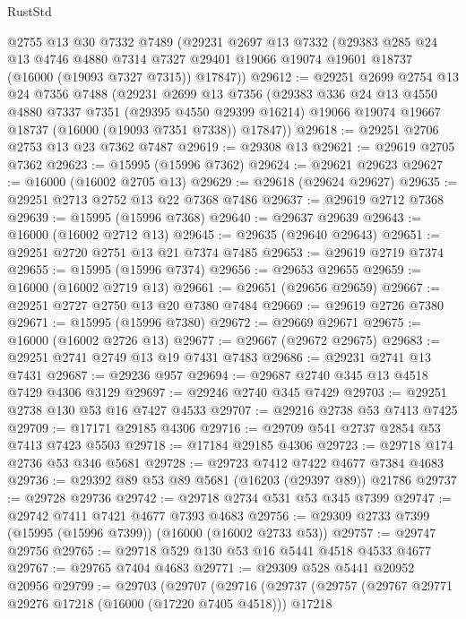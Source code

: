 \begin{lexlean}{RustStd}
\begin{coremodule}
    @2755
    @13
    @30
    @7332
    @7489
    (@29231
      @2697
      @13
      @7332
      (@29383
        @285
        @24
        @13
        @4746
        @4880
        @7314
        @7327
        @29401
        @19066
        @19074
        @19601
        @18737
        (@16000 (@19093 @7327 @7315))
        @17847))
@29612 := @29251
    @2699
    @2754
    @13
    @24
    @7356
    @7488
    (@29231
      @2699
      @13
      @7356
      (@29383
        @336
        @24
        @13
        @4550
        @4880
        @7337
        @7351
        (@29395 @4550 @29399 @16214)
        @19066
        @19074
        @19667
        @18737
        (@16000 (@19093 @7351 @7338))
        @17847))
@29618 := @29251 @2706 @2753 @13 @23 @7362 @7487
@29619 := @29308 @13
@29621 := @29619 @2705 @7362
@29623 := @15995 (@15996 @7362)
@29624 := @29621 @29623
@29627 := @16000 (@16002 @2705 @13)
@29629 := @29618 (@29624 @29627)
@29635 := @29251 @2713 @2752 @13 @22 @7368 @7486
@29637 := @29619 @2712 @7368
@29639 := @15995 (@15996 @7368)
@29640 := @29637 @29639
@29643 := @16000 (@16002 @2712 @13)
@29645 := @29635 (@29640 @29643)
@29651 := @29251 @2720 @2751 @13 @21 @7374 @7485
@29653 := @29619 @2719 @7374
@29655 := @15995 (@15996 @7374)
@29656 := @29653 @29655
@29659 := @16000 (@16002 @2719 @13)
@29661 := @29651 (@29656 @29659)
@29667 := @29251 @2727 @2750 @13 @20 @7380 @7484
@29669 := @29619 @2726 @7380
@29671 := @15995 (@15996 @7380)
@29672 := @29669 @29671
@29675 := @16000 (@16002 @2726 @13)
@29677 := @29667 (@29672 @29675)
@29683 := @29251 @2741 @2749 @13 @19 @7431 @7483
@29686 := @29231 @2741 @13 @7431
@29687 := @29236 @957
@29694 := @29687 @2740 @345 @13 @4518 @7429 @4306 @3129
@29697 := @29246 @2740 @345 @7429
@29703 := @29251 @2738 @130 @53 @16 @7427 @4533
@29707 := @29216 @2738 @53 @7413 @7425
@29709 := @17171 @29185 @4306
@29716 := @29709 @541 @2737 @2854 @53 @7413 @7423 @5503
@29718 := @17184 @29185 @4306
@29723 := @29718 @174 @2736 @53 @346 @5681
@29728 := @29723 @7412 @7422 @4677 @7384 @4683
@29736 := @29392 @89 @53 @89 @5681 (@16203 (@29397 @89)) @21786
@29737 := @29728 @29736
@29742 := @29718 @2734 @531 @53 @345 @7399
@29747 := @29742 @7411 @7421 @4677 @7393 @4683
@29756 := @29309 @2733 @7399 (@15995 (@15996 @7399)) (@16000 (@16002 @2733 @53))
@29757 := @29747 @29756
@29765 := @29718 @529 @130 @53 @16 @5441 @4518 @4533 @4677
@29767 := @29765 @7404 @4683
@29771 := @29309 @528 @5441 @20952 @20956
@29799 := @29703
    (@29707
      (@29716
        (@29737
          (@29757
            (@29767 @29771 @29276 @17218 (@16000 (@17220 @7405 @4518)))
            @17218

\end{coremodule}
\end{lexlean}
